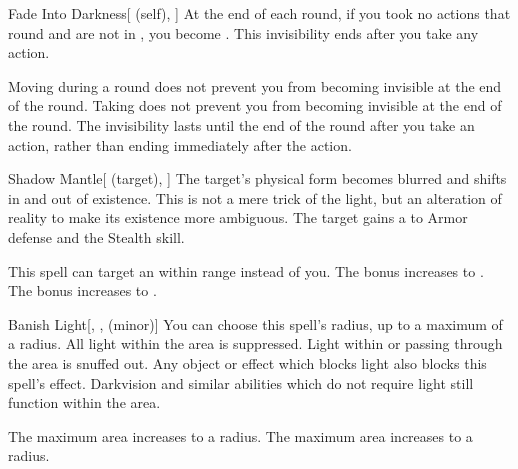 \lowercase{\hypertarget{spell:Fade Into Darkness}{}}\label{spell:Fade Into Darkness}
\begin{attuneability}[Rank 2]{\hypertarget{spell:Fade Into Darkness}{Fade Into Darkness}}[ (self), ]
At the end of each round, if you took no actions that round and are not in , you become .
This invisibility ends after you take any action.

\rankline
{} Moving during a round does not prevent you from becoming invisible at the end of the round.
 Taking  does not prevent you from becoming invisible at the end of the round.
 The invisibility lasts until the end of the round after you take an action, rather than ending immediately after the action.

\end{attuneability}
\vspace{0.25em}



\lowercase{\hypertarget{spell:Shadow Mantle}{}}\label{spell:Shadow Mantle}
\begin{attuneability}[Rank 2]{\hypertarget{spell:Shadow Mantle}{Shadow Mantle}}[ (target), ]
The target's physical form becomes blurred and shifts in and out of existence.
This is not a mere trick of the light, but an alteration of reality to make its existence more ambiguous.
The target gains a   to Armor defense and the Stealth skill.

\rankline
{} This spell can target an  within \rngmed range instead of you.
 The bonus increases to .
 The bonus increases to .

\end{attuneability}
\vspace{0.25em}



\lowercase{\hypertarget{spell:Banish Light}{}}\label{spell:Banish Light}
\begin{freeability}[Rank 3]{\hypertarget{spell:Banish Light}{Banish Light}}[, ,  (minor)]
You can choose this spell's radius, up to a maximum of a \areamed radius.
All light within the area is suppressed.
Light within or passing through the area is snuffed out.
Any object or effect which blocks light also blocks this spell's effect.
Darkvision and similar abilities which do not require light still function within the area.

\rankline
{} The maximum area increases to a \arealarge radius.
 The maximum area increases to a \areaext radius.

\end{freeability}
\vspace{0.25em}



